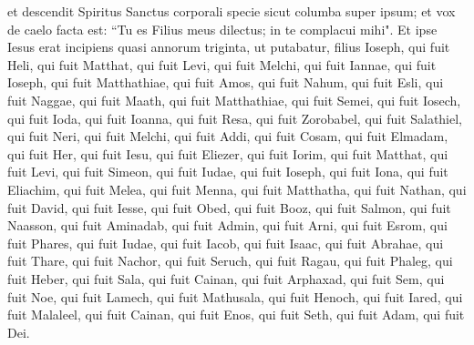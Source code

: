 \begin{biblechapter}
\verse et descendit Spiritus Sanctus corporali specie sicut columba super ipsum; et vox de caelo facta est: “Tu es Filius meus dilectus; in te complacui mihi". 
\verse Et ipse Iesus erat incipiens quasi annorum triginta, ut putabatur, filius Ioseph, qui fuit Heli, 
\verse qui fuit Matthat, qui fuit Levi, qui fuit Melchi, qui fuit Iannae, qui fuit Ioseph, 
\verse qui fuit Matthathiae, qui fuit Amos, qui fuit Nahum, qui fuit Esli, qui fuit Naggae, 
\verse qui fuit Maath, qui fuit Matthathiae, qui fuit Semei, qui fuit Iosech, qui fuit Ioda, 
\verse qui fuit Ioanna, qui fuit Resa, qui fuit Zorobabel, qui fuit Salathiel, qui fuit Neri,  
\verse qui fuit Melchi, qui fuit Addi, qui fuit Cosam, qui fuit Elmadam, qui fuit Her, 
\verse qui fuit Iesu, qui fuit Eliezer, qui fuit Iorim, qui fuit Matthat, qui fuit Levi, 
\verse qui fuit Simeon, qui fuit Iudae, qui fuit Ioseph, qui fuit Iona, qui fuit Eliachim, 
\verse qui fuit Melea, qui fuit Menna, qui fuit Matthatha, qui fuit Nathan, qui fuit David, 
\verse qui fuit Iesse, qui fuit Obed, qui fuit Booz, qui fuit Salmon, qui fuit Naasson, 
\verse qui fuit Aminadab, qui fuit Admin, qui fuit Arni, qui fuit Esrom, qui fuit Phares, qui fuit Iudae, 
\verse qui fuit Iacob, qui fuit Isaac, qui fuit Abrahae, qui fuit Thare, qui fuit Nachor, 
\verse qui fuit Seruch, qui fuit Ragau, qui fuit Phaleg, qui fuit Heber, qui fuit Sala, 
\verse qui fuit Cainan, qui fuit Arphaxad, qui fuit Sem, qui fuit Noe, qui fuit Lamech, 
\verse qui fuit Mathusala, qui fuit Henoch, qui fuit Iared, qui fuit Malaleel, qui fuit Cainan, 
\verse qui fuit Enos, qui fuit Seth, qui fuit Adam, qui fuit Dei. 
\end{biblechapter}

